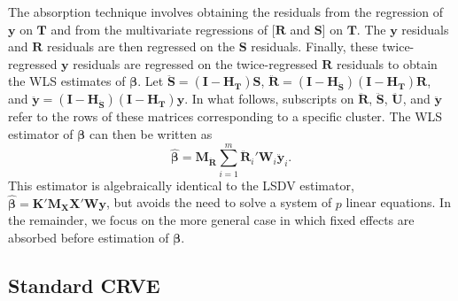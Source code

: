 \documentclass[12pt]{article}\usepackage[]{graphicx}\usepackage[]{color}
\newcommand{\bm}{\mathbf}
\newcommand{\bs}{\boldsymbol}
\begin{document}
The absorption technique involves obtaining the residuals from the regression of $\bm{y}$ on $\bm{T}$ and from the multivariate regressions of $[\bm{R}$ and $\bm{S}]$ on $\bm{T}$. 
The $\bm{y}$ residuals and $\bm{R}$ residuals are then regressed on the $\bm{S}$ residuals. 
Finally, these twice-regressed $\bm{y}$ residuals are regressed on the twice-regressed $\bm{R}$ residuals to obtain the WLS estimates of $\bs\beta$. 
Let $\bm{\ddot{S}} = \left(\bm{I} - \bm{H_T}\right)\bm{S}$, $\bm{\ddot{R}} = \left(\bm{I} - \bm{H_{\ddot{S}}}\right)\left(\bm{I} - \bm{H_T}\right)\bm{R}$, and $\bm{\ddot{y}} = \left(\bm{I} - \bm{H_{\ddot{S}}}\right)\left(\bm{I} - \bm{H_T}\right)\bm{y}$. 
In what follows, subscripts on $\bm{\ddot{R}}$, $\bm{\ddot{S}}$,  $\bm{\ddot{U}}$, and $\bm{\ddot{y}}$ refer to the rows of these matrices corresponding to a specific cluster. 
The WLS estimator of $\bs\beta$ can then be written as
\begin{equation}
\label{eq:WLS}
\bs{\hat\beta} = \bm{M_{\ddot{R}}} \sum_{i=1}^m \bm{\ddot{R}}_i' \bm{W}_i \bm{\ddot{y}}_i. 
\end{equation}
This estimator is algebraically identical to the LSDV estimator, $\bs{\hat\beta} = \bm{K}'\bm{M_X} \bm{X}' \bm{W} \bm{y}$, but avoids the need to solve a system of $p$ linear equations. In the remainder, we focus on the more general case in which fixed effects are absorbed before estimation of $\bs\beta$. 

\subsection{Standard CRVE}
\end{document}
